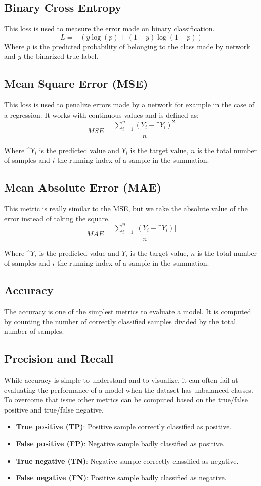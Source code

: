 \subsection{Binary Cross Entropy}
\label{sec:binary_cross_entropy}
This loss is used to measure the error made on binary classification.
$$ L = -(y\log(p) + (1-y)\log(1-p))$$
Where $p$ is the predicted probability of belonging to the class made by network and $y$ the binarized true label. 

\subsection{Mean Square Error (MSE)}
\label{sec:mean_square_error}
This loss is used to penalize errors made by a network for example in the case of a regression. It works with continuous values and is defined as:
$$ MSE = \frac{\sum_{i=1}^{n} (Y_i - \^{Y}_i)^2}{n}$$

Where $\^{Y}_i$ is the predicted value and $Y_i$ is the target value, $n$ is the total number of samples and $i$ the running index of a sample in the summation.
\subsection{Mean Absolute Error (MAE)}
This metric is really similar to the MSE, but we take the absolute value of the error instead of taking the square.
$$ MAE = \frac{\sum_{i=1}^{n} |(Y_i - \^{Y}_i)|}{n}$$

Where $\^{Y}_i$ is the predicted value and $Y_i$ is the target value, $n$ is the total number of samples and $i$ the running index of a sample in the summation.
\subsection{Accuracy}
The accuracy is one of the simplest metrics to evaluate a model. It is computed by counting the number of correctly classified samples divided by the total number of samples.


\subsection{Precision and Recall}
While accuracy is simple to understand and to visualize, it can often fail at evaluating the performance of a model when the dataset has unbalanced classes. To overcome that issue other metrics can be computed based on the true/false positive and true/false negative.

\begin{itemize}
    \item \textbf{True positive (TP)}: Positive sample correctly classified as positive. 
    \item \textbf{False positive (FP)}: Negative sample badly classified as positive. 
    \item \textbf{True negative (TN)}: Negative sample correctly classified as negative. 
    \item \textbf{False negative (FN)}: Positive sample badly classified as negative.
\end{itemize}

